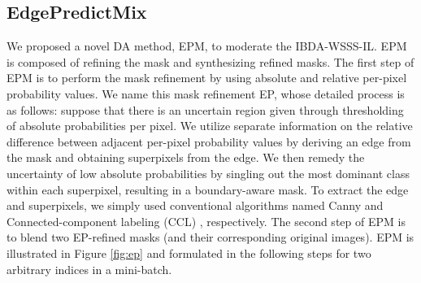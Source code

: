 \documentclass[11pt]{article}
\begin{document}
\subsection{EdgePredictMix}
\label{section:certainmix} 

We proposed a novel DA method, EPM, to moderate the IBDA-WSSS-IL. EPM is composed of refining the mask and synthesizing refined masks. The first step of EPM is to perform the mask refinement by using absolute and relative per-pixel probability values. We name this mask refinement EP, whose detailed process is as follows: suppose that there is an uncertain region given through thresholding of absolute probabilities per pixel. {We utilize separate information on the relative difference between adjacent per-pixel probability values by deriving an edge from the mask and obtaining superpixels from the edge. We then remedy the uncertainty of low absolute probabilities by singling out the most dominant class within each superpixel, resulting in a boundary-aware mask. To extract the edge and superpixels}, we simply used conventional algorithms named Canny \cite{canny1986computational} and Connected-component labeling (CCL) \cite{rosenfeld1966sequential}, respectively. The second step of EPM is to blend two EP-refined masks (and their corresponding original images). EPM is illustrated in Figure \ref{fig:ep} and formulated in the following steps for two arbitrary indices  in a mini-batch. 
 
\end{document}
